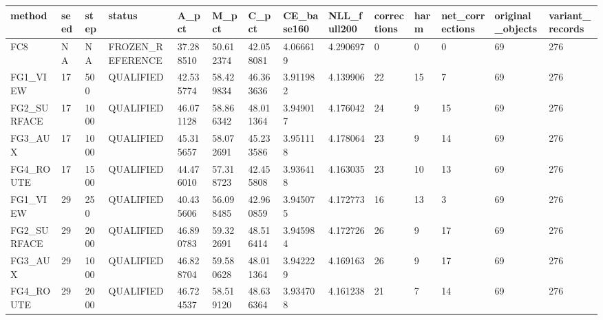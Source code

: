 \begin{tabular}{llllllllllllll}
\toprule
method & seed & step & status & A\_pct & M\_pct & C\_pct & CE\_base160 & NLL\_full200 & corrections & harm & net\_corrections & original\_objects & variant\_records \\
\midrule
FC8 & NA & NA & FROZEN\_REFERENCE & 37.288510 & 50.612374 & 42.058081 & 4.066619 & 4.290697 & 0 & 0 & 0 & 69 & 276 \\
FG1\_VIEW & 17 & 500 & QUALIFIED & 42.535774 & 58.429834 & 46.363636 & 3.911982 & 4.139906 & 22 & 15 & 7 & 69 & 276 \\
FG2\_SURFACE & 17 & 1000 & QUALIFIED & 46.071128 & 58.866342 & 48.011364 & 3.949017 & 4.176042 & 24 & 9 & 15 & 69 & 276 \\
FG3\_AUX & 17 & 1000 & QUALIFIED & 45.315657 & 58.072691 & 45.233586 & 3.951118 & 4.178064 & 23 & 9 & 14 & 69 & 276 \\
FG4\_ROUTE & 17 & 1500 & QUALIFIED & 44.476010 & 57.318723 & 42.455808 & 3.936418 & 4.163035 & 23 & 10 & 13 & 69 & 276 \\
FG1\_VIEW & 29 & 250 & QUALIFIED & 40.435606 & 56.098485 & 42.960859 & 3.945075 & 4.172773 & 16 & 13 & 3 & 69 & 276 \\
FG2\_SURFACE & 29 & 2000 & QUALIFIED & 46.890783 & 59.322691 & 48.516414 & 3.945984 & 4.172726 & 26 & 9 & 17 & 69 & 276 \\
FG3\_AUX & 29 & 1000 & QUALIFIED & 46.828704 & 59.580628 & 48.011364 & 3.942229 & 4.169163 & 26 & 9 & 17 & 69 & 276 \\
FG4\_ROUTE & 29 & 2000 & QUALIFIED & 46.724537 & 58.519120 & 48.636364 & 3.934708 & 4.161238 & 21 & 7 & 14 & 69 & 276 \\
\bottomrule
\end{tabular}
